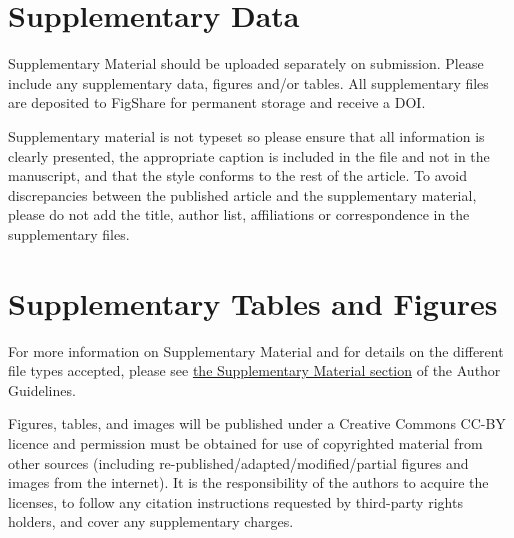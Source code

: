 \documentclass[utf8]{frontiers_suppmat} %
\begin{document}
\onecolumn
{}

\title[Supplementary Material]{{}}


\maketitle


\section{Supplementary Data}

Supplementary Material should be uploaded separately on
submission. Please include any supplementary data, figures and/or
tables. All supplementary files are deposited to FigShare for
permanent storage and receive a DOI.

Supplementary material is not typeset so please ensure that all
information is clearly presented, the appropriate caption is included
in the file and not in the manuscript, and that the style conforms to
the rest of the article. To avoid discrepancies between the published
article and the supplementary material, please do not add the title,
author list, affiliations or correspondence in the supplementary
files.

\section{Supplementary Tables and Figures}

For more information on Supplementary Material and for details on the
different file types accepted, please see
\href{http://home.frontiersin.org/about/author-guidelines#SupplementaryMaterial}{the
  Supplementary Material section} of the Author Guidelines.

Figures, tables, and images will be published under a Creative Commons
CC-BY licence and permission must be obtained for use of copyrighted
material from other sources (including
re-published/adapted/modified/partial figures and images from the
internet). It is the responsibility of the authors to acquire the
licenses, to follow any citation instructions requested by third-party
rights holders, and cover any supplementary charges.

\end{document}
